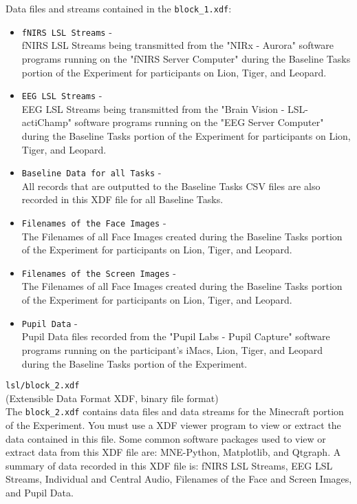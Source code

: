 \begin{description}
\begin{addmargin}[0em]{0em}
    Data files and streams contained in the \verb|block_1.xdf|:

    \begin{itemize}
        \item \verb|fNIRS LSL Streams| -\\fNIRS LSL Streams being transmitted from the "NIRx - Aurora" software programs running on the "fNIRS Server Computer" during the Baseline Tasks portion of the Experiment for participants on Lion, Tiger, and Leopard.
        \item \verb|EEG LSL Streams| -\\EEG LSL Streams being transmitted from the "Brain Vision - LSL-actiChamp" software programs running on the "EEG Server Computer" during the Baseline Tasks portion of the Experiment for participants on Lion, Tiger, and Leopard.
        \item \verb|Baseline Data for all Tasks| -\\All records that are outputted to the Baseline Tasks CSV files are also recorded in this XDF file for all Baseline Tasks.
        \item \verb|Filenames of the Face Images| -\\The Filenames of all Face Images created during the Baseline Tasks portion of the Experiment for participants on Lion, Tiger, and Leopard.
        \item \verb|Filenames of the Screen Images| -\\The Filenames of all Face Images created during the Baseline Tasks portion of the Experiment for participants on Lion, Tiger, and Leopard.
        \item \verb|Pupil Data| -\\Pupil Data files recorded from the "Pupil Labs - Pupil Capture" software programs running on the participant's iMacs, Lion, Tiger, and Leopard during the Baseline Tasks portion of the Experiment.
    \end{itemize}


    \medskip
    \item\verb|lsl/block_2.xdf|\\(Extensible Data Format XDF, binary file format)\\
    The \verb|block_2.xdf| contains data files and data streams for the Minecraft portion of the Experiment. You must use a XDF viewer program to view or extract the data contained in this file. Some common software packages used to view or extract data from this XDF file are: MNE-Python, Matplotlib, and Qtgraph. A summary of data recorded in this XDF file is: fNIRS LSL Streams, EEG LSL Streams, Individual and Central Audio, Filenames of the Face and Screen Images, and Pupil Data.


\end{addmargin}
\end{description}
